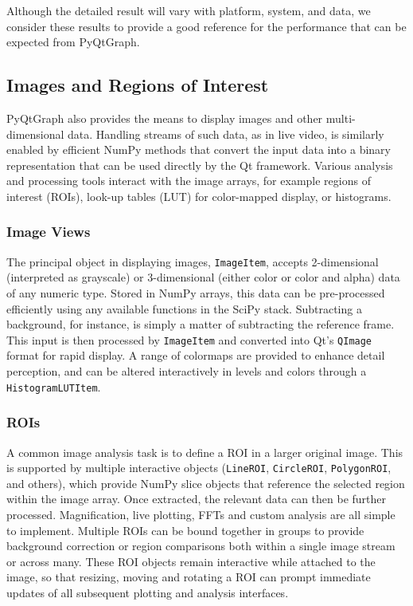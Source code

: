 \documentclass[journal]{vgtc}                %
\begin{document}
Although the detailed result will vary with platform, system, and data, we consider these results to provide a good reference for the performance that can be expected from PyQtGraph.

\makeLineBenchmarkFig

\subsection{Images and Regions of Interest}

PyQtGraph also provides the means to display images and other multi-dimensional data. Handling streams of such data, as in live video, is similarly enabled by efficient NumPy methods that convert the input data into a binary representation that can be used directly by the Qt framework. Various analysis and processing tools interact with the image arrays, for example regions of interest (ROIs), look-up tables (LUT) for color-mapped display, or histograms.

\subsubsection{Image Views}

\makeARBBenchmarkFig

\makeMatplotlibComparison

The principal object in displaying images, \texttt{ImageItem}, accepts 2-dimensional (interpreted as grayscale) or 3-dimensional (either color or color and alpha) data of any numeric type. Stored in NumPy arrays, this data can be pre-processed efficiently using any available functions in the SciPy stack. Subtracting a background, for instance, is simply a matter of subtracting the reference frame. This input is then processed by \texttt{ImageItem} and converted into Qt's \texttt{QImage} format for rapid display. A range of colormaps are provided to enhance detail perception, and can be altered interactively in levels and colors through a \texttt{HistogramLUTItem}.

\subsubsection{ROIs}

A common image analysis task is to define a ROI in a larger original image. This is supported by multiple interactive objects (\texttt{LineROI}, \texttt{CircleROI}, \texttt{PolygonROI}, and others), which provide NumPy slice objects that reference the selected region within the image array. Once extracted, the relevant data can then be further processed. Magnification, live plotting, FFTs and custom analysis are all simple to implement. Multiple ROIs can be bound together in groups to provide background correction or region comparisons both within a single image stream or across many. These ROI objects remain interactive while attached to the image, so that resizing, moving and rotating a ROI can prompt immediate updates of all subsequent plotting and analysis interfaces.
\end{document}

